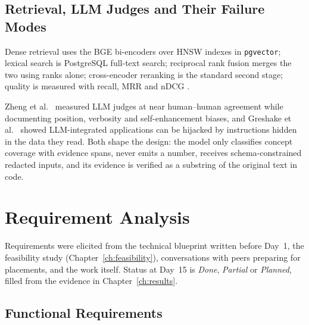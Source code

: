 \documentclass{tietreport}
\begin{document}
\section{Retrieval, LLM Judges and Their Failure Modes}

Dense retrieval uses the BGE bi-encoders \cite{xiao2023cpack} over HNSW indexes \cite{malkov2020hnsw} in \texttt{pgvector}; lexical search is PostgreSQL full-text search; reciprocal rank fusion \cite{cormack2009rrf} merges the two using ranks alone; cross-encoder reranking \cite{nogueira2019bert} is the standard second stage; quality is measured with recall, MRR and nDCG \cite{jarvelin2002ndcg}.

Zheng et al.\  \cite{zheng2023judge} measured LLM judges at near human--human agreement while documenting position, verbosity and self-enhancement biases, and Greshake et al.\  \cite{greshake2023injection} showed LLM-integrated applications can be hijacked by instructions hidden in the data they read. Both shape the design: the model only classifies concept coverage with evidence spans, never emits a number, receives schema-constrained redacted inputs, and its evidence is verified as a substring of the original text in code.

\chapter{Requirement Analysis}
\label{ch:requirements}

Requirements were elicited from the technical blueprint written before Day~1, the feasibility study (Chapter~\ref{ch:feasibility}), conversations with peers preparing for placements, and the work itself. Status at Day~15 is \emph{Done}, \emph{Partial} or \emph{Planned}, filled from the evidence in Chapter~\ref{ch:results}.

\section{Functional Requirements}
\end{document}
